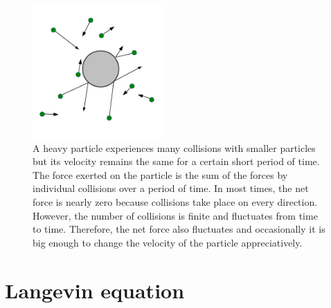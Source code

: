 \begin{figure}
\centering
\includegraphics[width=2in]{18.Langevin/brownian_particle.pdf}
\caption{A heavy particle experiences many collisions with smaller particles but its velocity remains the same for a certain short period of time.   The force exerted on the particle is the sum of the forces by individual collisions over a period of time.  In most times, the net force is nearly zero because collisions take place on every direction.  However, the number of collisions is finite and fluctuates from time to time. Therefore, the net force also fluctuates and occasionally it is big enough to change the velocity of the particle appreciatively.}
\label{fig:brownian_particle}
\end{figure}

\section{Langevin equation}

